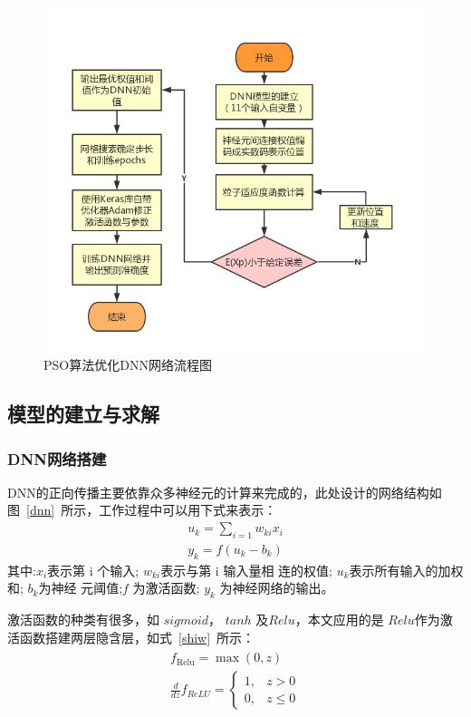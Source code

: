 \documentclass{whutmod}
\begin{document}
	\begin{figure}[H]
	\centering
	\includegraphics[width=\textwidth]{figures/21.png}
	\caption{PSO算法优化DNN网络流程图}\label{2222}
	\end{figure}


	\subsection{模型的建立与求解}
	
	\subsubsection{DNN网络搭建}
	DNN的正向传播主要依靠众多神经元的计算来完成的，此处设计的网络结构如图~\ref{dnn}~所示，工作过程中可以用下式来表示：
			\begin{gather}
{u_{k}=\sum_{i=1} w_{k i} x_{i}} \\ {y_{k}=f\left(u_{k}-b_{k}\right)}
	\end{gather}
	其中:$x_{i}$表示第 i 个输入; $w_{ki}$表示与第 i 输入量相 连的权值; $u_{k}$表示所有输入的加权和; $b_{k}$为神经 元阈值;$ f$ 为激活函数; $y_{k}$ 为神经网络的输出。
	
	激活函数的种类有很多，如 $sigmoid$， $tanh$ 及$ Relu$，本文应用的是 $Relu$作为激活函数搭建两层隐含层，如式~\ref{shiw}~所示：
	\begin{gather}\label{shiw}
		\begin{array}{c}{f_{\text {Relu}}=\max (0, z)}\\
		\frac{d}{d z} f_{R e L U}=\left\{\begin{array}{ll}{1,} & {z>0} \\ {0,} & {z \leqslant 0}\end{array}\right.
		\end{array}
	\end{gather}
	
\end{document}
